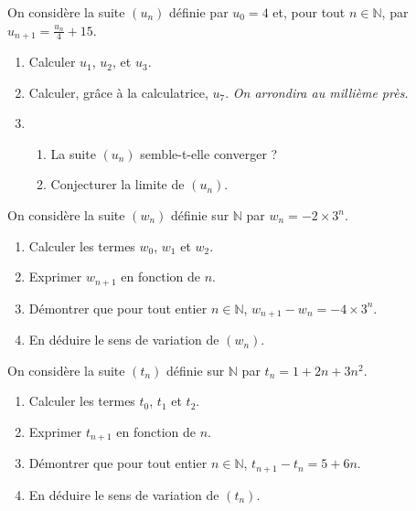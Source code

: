 \documentclass[11pt]{article}
\begin{document}
\begin{exo}[$2$ points]
  On considère la suite $(u_n)$ définie par $u_0=4$ et, pour tout
  $n\in\mathbb{N}$, par $u_{n+1}=\frac{u_n}{4}+15$.
  \begin{enumerate}
    \item Calculer $u_1$, $u_2$, et $u_3$.
    \item Calculer, gr\^ace à la calculatrice, $u_{7}$. \emph{On arrondira au
      millième près.}
    \item \begin{enumerate}
        \item La suite $(u_n)$ semble-t-elle converger ?
        \item Conjecturer la limite de $(u_n)$.
      \end{enumerate}
  \end{enumerate}
\end{exo}

\begin{exo}[$3$ points]
  On considère la suite $(w_n)$ définie sur $\mathbb{N}$ par $w_n=-2\times3^n$.
  \begin{enumerate}
    \item Calculer les termes $w_0$, $w_1$ et $w_2$.
    \item Exprimer $w_{n+1}$ en fonction de $n$.
    \item Démontrer que pour tout entier $n\in\mathbb{N}$,
      $w_{n+1}-w_n=-4\times3^n$.
    \item En déduire le sens de variation de $(w_n)$.
  \end{enumerate}
\end{exo}

\begin{exo}[$3$ points]
  On considère la suite $(t_n)$ définie sur $\mathbb{N}$ par
  $t_n=1+2n+3n^2$.
  \begin{enumerate}
    \item Calculer les termes $t_0$, $t_1$ et $t_2$.
    \item Exprimer $t_{n+1}$ en fonction de $n$.
    \item Démontrer que pour tout entier $n\in\mathbb{N}$,
      $t_{n+1}-t_n=5+6n$.
    \item En déduire le sens de variation de $(t_n)$.
  \end{enumerate}
\end{exo}
\end{document}
